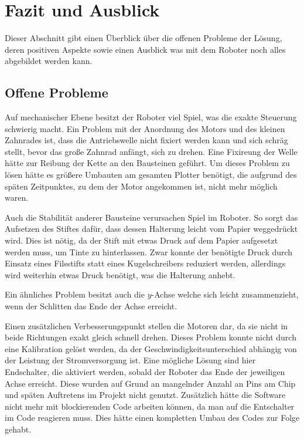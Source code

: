 \documentclass[conference,compsoc,final,a4paper]{IEEEtran}
\begin{document}
\section{Fazit und Ausblick}

Dieser Abschnitt gibt einen Überblick über die offenen Probleme der Lösung, deren positiven 
Aspekte sowie einen Ausblick was mit dem Roboter noch alles abgebildet werden kann.

\subsection{Offene Probleme}

Auf mechanischer Ebene besitzt der Roboter viel Spiel, was die exakte Steuerung schwierig macht. Ein Problem mit der Anordnung
des Motors und des kleinen Zahnrades ist, dass die
Antriebswelle nicht fixiert werden kann und sich schräg stellt, bevor das große Zahnrad anfängt, sich zu drehen. Eine Fixireung der Welle hätte zur Reibung der Kette an den Bausteinen geführt.
Um dieses Problem zu lösen hätte es größere
Umbauten am gesamten Plotter benötigt, die aufgrund des späten Zeitpunktes, zu dem der Motor angekommen ist, nicht mehr möglich waren.

Auch die Stabilität anderer Bausteine verursachen Spiel im Roboter. So sorgt das Aufsetzen des Stiftes dafür, dass dessen Halterung
leicht vom Papier weggedrückt wird. Dies ist nötig, da der Stift mit etwas Druck auf dem Papier aufgesetzt werden muss, um
Tinte zu hinterlassen. Zwar konnte der benötigte Druck durch Einsatz eines Filsstifts statt eines Kugelschreibers reduziert werden,
allerdings wird weiterhin etwas Druck benötigt, was die Halterung anhebt.

Ein ähnliches Problem besitzt auch die $y$-Achse welche sich leicht zusammenzieht, wenn der Schlitten das Ende der Achse erreicht.

Einen zusätzlichen Verbesserungspunkt stellen die Motoren dar, da sie nicht in beide Richtungen exakt gleich schnell drehen. Dieses Problem konnte nicht durch eine Kalibration gelöst werden, da der Geschwindigkeitsunterschied abhängig von der Leistung der Stromversorgung ist. Eine
mögliche Lösung sind hier Endschalter, die aktiviert werden, sobald der Roboter das Ende der jeweiligen Achse erreicht. Diese wurden
auf Grund an mangelnder Anzahl an Pins am Chip und späten Auftretens im Projekt nicht genutzt. Zusätzlich
hätte die Software nicht mehr mit blockierenden Code arbeiten können, da man auf die Entschalter im Code
reagieren muss. Dies hätte einen kompletten Umbau des Codes zur Folge gehabt.
\end{document}
